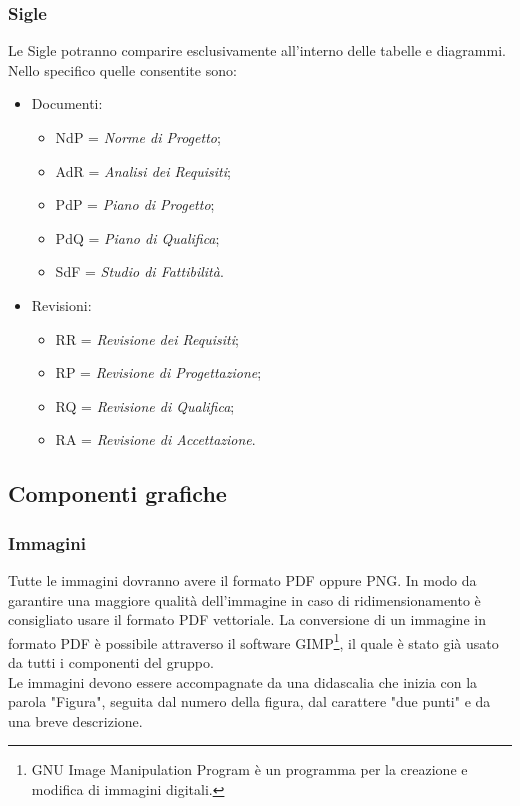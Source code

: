 \subsubsection{Sigle}
Le Sigle potranno comparire esclusivamente all'interno delle tabelle e diagrammi. Nello specifico quelle consentite sono: 
\begin{itemize}
	\item Documenti:
	\begin{itemize}
		\item NdP = \textit{Norme di Progetto};
		\item AdR = \textit{Analisi dei Requisiti};
		\item PdP = \textit{Piano di Progetto};
		\item PdQ = \textit{Piano di Qualifica};
		\item SdF = \textit{Studio di Fattibilità}.
	\end{itemize}
	\item Revisioni:
	\begin{itemize}
		\item RR = \textit{Revisione dei Requisiti};
		\item RP = \textit{Revisione di Progettazione};
		\item RQ = \textit{Revisione di Qualifica};
		\item RA = \textit{Revisione di Accettazione}.
	\end{itemize}
\end{itemize}

\subsection{Componenti grafiche}
\subsubsection{Immagini}
Tutte le immagini dovranno avere il formato PDF oppure PNG. In modo da garantire una maggiore qualità dell'immagine in caso di ridimensionamento è consigliato usare il formato PDF vettoriale. La conversione di un immagine in formato PDF è possibile attraverso il software GIMP\footnote{GNU Image Manipulation Program è un programma per la creazione e modifica di immagini digitali.}, il quale è stato già usato da tutti  i componenti del gruppo. \\ Le immagini devono essere accompagnate da una didascalia che inizia con la parola "Figura", seguita dal numero della figura, dal carattere "due punti" e da una breve descrizione.
